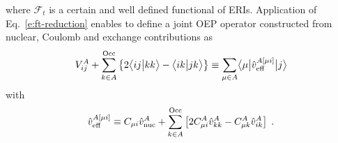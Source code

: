 %
where ${\mathcal{F}}_t$ is a certain and well defined functional of ERIs.
Application of Eq.~\eqref{e:ft-reduction} enables to define
a joint OEP
operator constructed from nuclear, Coulomb and exchange
contributions as
%
\begin{equation}
 V^A_{ij} + 
 \sum_{k\in A}^{\rm Occ} 
  \left\{ 2\bigl\langle {ij} \bigl\lvert {kk} \bigr\rangle - \bigl\langle {ik} \bigl\lvert {jk} \bigr\rangle \right\}
\equiv \sum_{\mu\in A} \bigl\langle {\mu} \bigl\lvert { 
\hat{v}^{A[\mu i]}_{\rm eff}
 } \bigl\lvert {j} \bigr\rangle
\end{equation}
%
with
%
\begin{equation}
 \hat{v}^{A[\mu i]}_{\rm eff} \equiv C_{\mu i} \hat{v}^A_{\rm nuc} + 
 \sum_{k\in A}^{\rm Occ} \left[
 2C_{\mu i}^A \hat{v}^A_{kk} - C_{\mu k}^A \hat{v}^A_{ik}
 \right] \;.
\end{equation}
%
%
%
